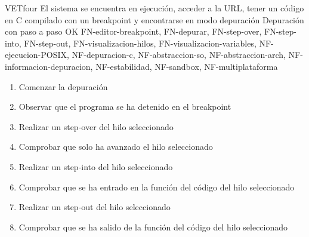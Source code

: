     \begin{testCase}{VET}{four}
        {El sistema se encuentra en ejecución, acceder a la URL, tener un código en C compilado con un breakpoint y encontrarse en modo depuración}
        {\NA}
        {Depuración con paso a paso}
        {OK}
        {FN-editor-breakpoint, FN-depurar, FN-step-over, FN-step-into, FN-step-out, FN-visualizacion-hilos, FN-visualizacion-variables, NF-ejecucion-POSIX, NF-depuracion-c, NF-abstraccion-so, NF-abstraccion-arch, NF-informacion-depuracion, NF-estabilidad, NF-sandbox, NF-multiplataforma}
        
        \begin{enumerate}
            \item Comenzar la depuración
            \item Observar que el programa se ha detenido en el breakpoint
            \item Realizar un step-over del hilo seleccionado
            \item Comprobar que solo ha avanzado el hilo seleccionado
            \item Realizar un step-into del hilo seleccionado
            \item Comprobar que se ha entrado en la función del código del hilo seleccionado
            \item Realizar un step-out del hilo seleccionado
            \item Comprobar que se ha salido de la función del código del hilo seleccionado
        \end{enumerate}
    \end{testCase}

